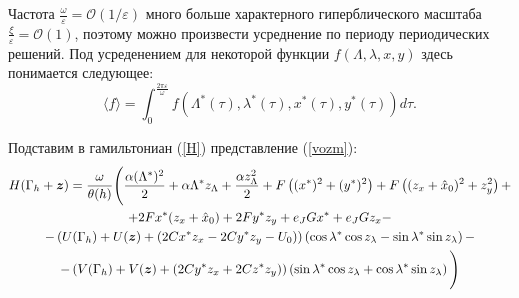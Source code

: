 Частота $\frac{\omega}{\varepsilon}=\mathcal{O}(1/\varepsilon)$ много больше характерного гиперблического масштаба $\frac{\xi}{\varepsilon} = \mathcal{O}(1)$, поэтому можно произвести усреднение по периоду периодических решений. Под усреденением для некоторой функции $f(\Lambda,\lambda,x,y)$ здесь понимается следующее:
$$\langle f \rangle = \int_0^{\frac{2 \pi \varepsilon}{\omega}} f \left(\Lambda^*(\tau),\lambda^*(\tau),x^*(\tau),y^*(\tau) \right) d\tau.$$





Подставим в гамильтониан (\ref{H}) представление (\ref{vozm}):
\begin{multline*}
H(\Gamma_h+ \boldsymbol{z}) = \frac{\omega}{\theta(h)}\Bigg( \frac{\alpha(\Lambda^*)^2}{2} + \alpha \Lambda^* z_\Lambda + \frac{\alpha z_\Lambda^2}{2} + F \left( (x^*)^2 + (y^*)^2 \right) + F\left( (z_x+\hat x_0)^2 + z_y^2 \right) + \\ + 2F x^* (z_x+\hat x_0) + 2Fy^* z_y
 + e_J G x^* + e_J G z_x - \\ - \left( U(\Gamma_h) + U(\boldsymbol{z}) + (2C x^* z_x - 2C y^* z_y - U_0) \right) \left( \cos \lambda^* \cos z_\lambda - \sin \lambda^* \sin z_\lambda \right) - \\ - \left( V(\Gamma_h) + V(\boldsymbol{z}) + (2C y^* z_x + 2C z^* z_y) \right) \left( \sin \lambda^* \cos z_\lambda + \cos \lambda^* \sin z_\lambda \right) \Bigg)
\end{multline*}

